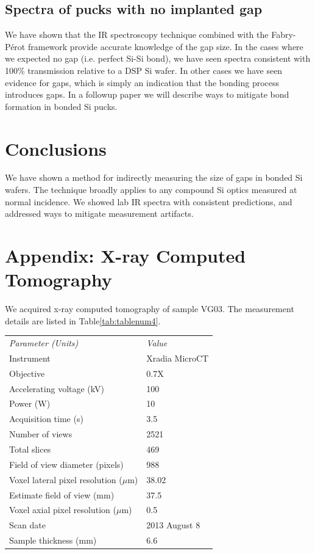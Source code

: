 \documentclass[osajnl,preprint,showpacs,superscriptaddress,12pt]{revtex4-1} %
\begin{document}
\subsection{Spectra of pucks with no implanted gap}
We have shown that the IR spectroscopy technique combined with the Fabry-P\'{e}rot framework provide accurate knowledge of the gap size.  In the cases where we expected no gap (i.e. perfect Si-Si bond), we have seen spectra consistent with 100\% transmission relative to a DSP Si wafer.  In other cases we have seen evidence for gaps, which is simply an indication that the bonding process introduces gaps.  In a followup paper we will describe ways to mitigate bond formation in bonded Si pucks.

\section{Conclusions}
We have shown a method for indirectly measuring the size of gaps in bonded Si wafers.  The technique broadly applies to any compound Si optics measured at normal incidence.  We showed lab IR spectra with consistent predictions, and addressed ways to mitigate measurement artifacts. 

\appendix

\section{Appendix: X-ray Computed Tomography}
We acquired x-ray computed tomography of sample VG03.  The measurement details are listed in Table\ref{tab:tablenum4}.


\begin{center}
    \begin{tabular}{ll}
    \emph{Parameter (Units)} & \emph{Value} \\ 
    Instrument& Xradia MicroCT \\
     Objective & 0.7X \\
    Accelerating voltage (kV) & 100 \\
        Power (W) & 10 \\
        Acquisition time (s) & 3.5 \\
        Number of views & 2521 \\
        Total slices & 469 \\
        Field of view diameter (pixels) & 988 \\
        Voxel lateral pixel resolution ($\mu$m) & 38.02 \\
        Estimate field of view (mm) & 37.5 \\
        Voxel axial pixel resolution ($\mu$m) & 0.5 \\
        Scan date & 2013 August 8 \\
        Sample thickness (mm) & 6.6 \\
     \end{tabular}
\end{center}
\end{document}

